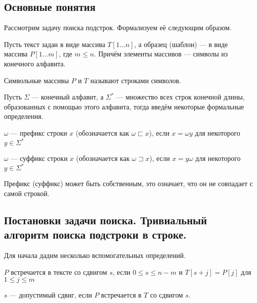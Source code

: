 
\subsection{Основные понятия}

Рассмотрим задачу поиска подстрок. Формализуем её следующим образом.
\begin{remark}
	Пусть текст задан в виде массива $T[1 \ldots n]$, а образец (шаблон) --- в виде массива
	$P[1 \ldots m]$, где $m \leq n$. Причём элементы массивов --- символы из конечного алфавита. 
\end{remark}

\begin{definition}
	Символьные массивы $P$ и $T$ называют строками символов.
\end{definition}

Пусть $\Sigma$ --- конечный алфавит, а $\Sigma^{*}$ --- множество всех строк конечной длины, образованных
с помощью этого алфавита, тогда введём некоторые формальные определения.

\begin{definition}
	$\omega$ --- префикс строки $x$ (обозначается как $ \omega \sqsubset x$), если $x = \omega y$
	для некоторого $y \in \Sigma^{*}$ 
\end{definition}

\begin{definition}
	$ \omega$ --- суффикс строки $x$ (обозначается как $ \omega \sqsupset x$), если $x = y \omega $
	для некоторого $y \in \Sigma^{*}$ 
\end{definition}

\begin{remark}
	Префикс (суффикс) может быть собственным, это означает, что он не совпадает с самой строкой.
\end{remark}

\subsection{Постановки задачи поиска. Тривиальный алгоритм поиска подстроки в строке.}
Для начала дадим несколько вспомогательных определений.
\begin{definition}
	$P$ встречается в тексте со сдвигом $s$, если $0 \leq s \leq n - m$ и $T[s + j] = P[j]$ 
	 для $1 \leq j \leq m$
\end{definition}

\begin{definition}
	$s$ --- допустимый сдвиг, если $P$ встречается в $T$ со сдвигом $s$.
\end{definition}

